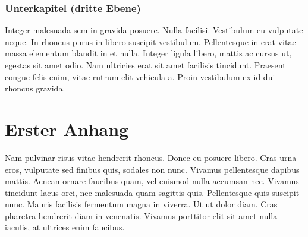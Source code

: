\documentclass[12pt,a4paper,parskip=half]{scrartcl}
\begin{document}
\subsubsection{Unterkapitel (dritte Ebene)}

Integer malesuada sem in gravida posuere. Nulla facilisi. Vestibulum eu vulputate neque. In rhoncus purus in libero suscipit vestibulum. Pellentesque in erat vitae massa elementum blandit in et nulla. Integer ligula libero, mattis ac cursus ut, egestas sit amet odio. Nam ultricies erat sit amet facilisis tincidunt. Praesent congue felis enim, vitae rutrum elit vehicula a. Proin vestibulum ex id dui rhoncus gravida.

\OWbibliography

\appendix

\section{Erster Anhang}

Nam pulvinar risus vitae hendrerit rhoncus. Donec eu posuere libero. Cras urna eros, vulputate sed finibus quis, sodales non nunc. Vivamus pellentesque dapibus mattis. Aenean ornare faucibus quam, vel euismod nulla accumsan nec. Vivamus tincidunt lacus orci, nec malesuada quam sagittis quis. Pellentesque quis suscipit nunc. Mauris facilisis fermentum magna in viverra. Ut ut dolor diam. Cras pharetra hendrerit diam in venenatis. Vivamus porttitor elit sit amet nulla iaculis, at ultrices enim faucibus.
\end{document}
